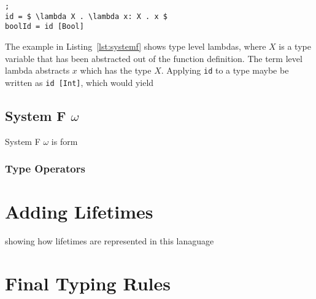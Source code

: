 \begin{lstlisting}[mathescape, nolol, label={lst:systemf}];
id = $ \lambda X . \lambda x: X . x $
boolId = id [Bool]
\end{lstlisting}

The example in Listing~\ref{lst:systemf} shows type level lambdas, where $ X $
is a type variable that has been abstracted out of the function definition. The
term level lambda abstracts $ x $ which has the type $ X $. Applying \lstinline{id}
to a type maybe be written as \lstinline[mathescape]{id [Int]}, which would
yield 

\subsection{System F $\omega$}\label{sec:omega}
System F $\omega$ is form

\subsubsection{Type Operators}

\section{Adding Lifetimes}
showing how lifetimes are represented in this lanaguage

\section{Final Typing Rules}

